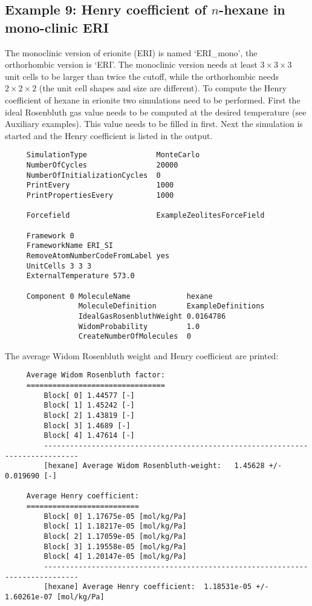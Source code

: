 \subsection*{Example 9: Henry coefficient of $n$-hexane in mono-clinic ERI}
The monoclinic version of erionite (ERI) is named `ERI\_mono', the orthorhombic version is `ERI'.
The monoclinic version needs at least $3\times3\times3$ unit cells to be larger than twice the cutoff,
while the orthorhombic needs $2\times2\times2$ (the unit cell shapes and size are different).
To compute the Henry coefficient of hexane in erionite two simulations need to be performed. First
the ideal Rosenbluth gas value needs to be computed at the desired temperature (see Auxiliary examples).
This value needs to be filled in first. Next the simulation is started and the Henry coefficient is
listed in the output.
\begin{tiny}
\begin{verbatim}
     SimulationType                MonteCarlo
     NumberOfCycles                20000
     NumberOfInitializationCycles  0
     PrintEvery                    1000
     PrintPropertiesEvery          1000

     Forcefield                    ExampleZeolitesForceField

     Framework 0
     FrameworkName ERI_SI
     RemoveAtomNumberCodeFromLabel yes
     UnitCells 3 3 3
     ExternalTemperature 573.0

     Component 0 MoleculeName             hexane
                 MoleculeDefinition       ExampleDefinitions
                 IdealGasRosenbluthWeight 0.0164786
                 WidomProbability         1.0
                 CreateNumberOfMolecules  0
\end{verbatim}
\end{tiny}

\noindent
The average Widom Rosenbluth weight and Henry coefficient are printed:
\begin{tiny}
\begin{verbatim}
     Average Widom Rosenbluth factor:
     ================================
         Block[ 0] 1.44577 [-]
         Block[ 1] 1.45242 [-]
         Block[ 2] 1.43819 [-]
         Block[ 3] 1.4689 [-]
         Block[ 4] 1.47614 [-]
         ------------------------------------------------------------------------------
         [hexane] Average Widom Rosenbluth-weight:   1.45628 +/- 0.019690 [-]

     Average Henry coefficient:
     ==========================
         Block[ 0] 1.17675e-05 [mol/kg/Pa]
         Block[ 1] 1.18217e-05 [mol/kg/Pa]
         Block[ 2] 1.17059e-05 [mol/kg/Pa]
         Block[ 3] 1.19558e-05 [mol/kg/Pa]
         Block[ 4] 1.20147e-05 [mol/kg/Pa]
         ------------------------------------------------------------------------------
         [hexane] Average Henry coefficient:  1.18531e-05 +/- 1.60261e-07 [mol/kg/Pa]
\end{verbatim}
\end{tiny}

